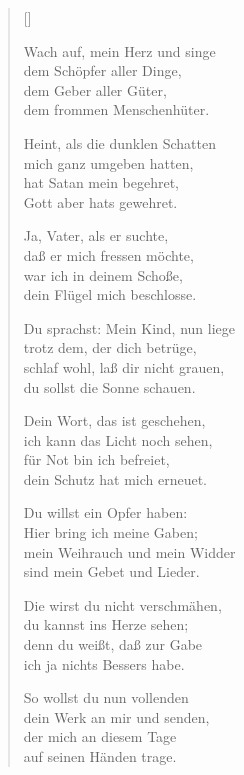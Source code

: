 \begin{multicols}{2}
\settowidth{\versewidth}{Heint, als die dunklen Schatten}
\begin{verse}[\versewidth]

 Wach auf, mein Herz und singe\\
dem Schöpfer aller Dinge,\\
dem Geber aller Güter,\\
dem frommen Menschenhüter.

 Heint, als die dunklen Schatten\\
mich ganz umgeben hatten,\\
hat Satan mein begehret,\\
Gott aber hats gewehret.

 Ja, Vater, als er suchte,\\
daß er mich fressen möchte,\\
war ich in deinem Schoße,\\
dein Flügel mich beschlosse.

 Du sprachst: Mein Kind, nun liege\\
trotz dem, der dich betrüge,\\
schlaf wohl, laß dir nicht grauen,\\
du sollst die Sonne schauen.

 Dein Wort, das ist geschehen,\\
ich kann das Licht noch sehen,\\
für Not bin ich befreiet,\\
dein Schutz hat mich erneuet.

 Du willst ein Opfer haben:\\
Hier bring ich meine Gaben;\\
mein Weihrauch und mein Widder\\
sind mein Gebet und Lieder.

 Die wirst du nicht verschmähen,\\
du kannst ins Herze sehen;\\
denn du weißt, daß zur Gabe\\
ich ja nichts Bessers habe.

 So wollst du nun vollenden\\
dein Werk an mir und senden,\\
der mich an diesem Tage\\
auf seinen Händen trage.


\end{verse}
\end{multicols}
